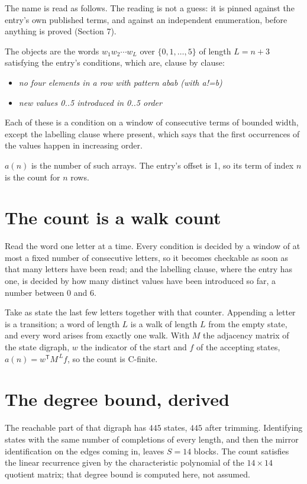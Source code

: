 \documentclass[11pt]{article}
\theoremstyle{definition}
\begin{document}
The name is read as follows. The reading is not a guess: it is pinned against the entry's own published terms, and against an independent enumeration, before anything is proved (Section 7).

The objects are the words $w_1 w_2 \cdots w_L$ over $\{0,1,\dots,5\}$ of length $L = n + 3$ satisfying the entry's conditions, which are, clause by clause:

\begin{itemize}

\item {\itshape no four elements in a row with pattern abab (with a!=b)}

\item {\itshape new values 0..5 introduced in 0..5 order}

\end{itemize}

Each of these is a condition on a window of consecutive terms of bounded width, except the labelling clause where present, which says that the first occurrences of the values happen in increasing order.

$a(n)$ is the number of such arrays. The entry's offset is 1, so its term of index $n$ is the count for $n$ rows.

\section{The count is a walk count}

Read the word one letter at a time. Every condition is decided by a window of at most a fixed number of consecutive letters, so it becomes checkable as soon as that many letters have been read; and the labelling clause, where the entry has one, is decided by how many distinct values have been introduced so far, a number between $0$ and 6.

Take as state the last few letters together with that counter. Appending a letter is a transition; a word of length $L$ is a walk of length $L$ from the empty state, and every word arises from exactly one walk. With $M$ the adjacency matrix of the state digraph, $w$ the indicator of the start and $f$ of the accepting states, $a(n) = w^{\mathsf T}M^{\,L}f$, so the count is C-finite.

\section{The degree bound, derived}

The reachable part of that digraph has $445$ states, $445$ after trimming. Identifying states with the same number of completions of every length, and then the mirror identification on the edges coming in, leaves $S = 14$ blocks. The count satisfies the linear recurrence given by the characteristic polynomial of the $14\times14$ quotient matrix; that degree bound is computed here, not assumed.
\end{document}
